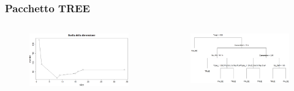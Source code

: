 	\begin{frame}
	\frametitle{Pacchetto TREE}
		\begin{center}
			\begin{figure}
				
			\end{figure}
			\begin{columns}
				\begin{column}{0.5\textwidth}
					\begin{center}
						\begin{figure}
							\includegraphics[width=\columnwidth]{img/cvginitree}
						\end{figure}
					\end{center}				
				\end{column}
				\begin{column}{0.5\textwidth}
					\begin{figure}
						\includegraphics[width=\columnwidth]{img/treeGinipr2}
					\end{figure}
				\end{column}
			\end{columns}		
		\end{center}
	\end{frame}

